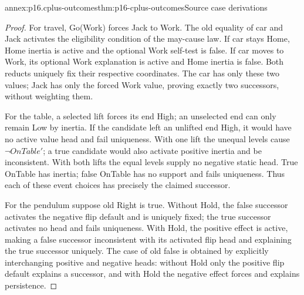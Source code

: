 \begin{annexitem}{annex:p16.cplus-outcomes}{thm:p16-cplus-outcomes}{Source case derivations}
\begin{proof}
For travel, Go(Work) forces Jack to Work.
The old equality of car and Jack activates the eligibility condition
of the may-cause law. If car stays Home, Home inertia is active and
the optional Work self-test is false. If car moves to Work, its
optional Work explanation is active and Home inertia is false.
Both reducts uniquely fix their respective coordinates.
The car has only these two values; Jack has only the forced Work
value, proving exactly two successors, without weighting them.

For the table, a selected lift forces its end High; an unselected
end can only remain Low by inertia. If the candidate left an unlifted
end High, it would have no active value head and fail uniqueness.
With one lift the unequal levels cause \(\neg OnTable'\);
a true candidate would also activate positive inertia and be
inconsistent. With both lifts the equal levels supply no negative
static head. True OnTable has inertia; false OnTable has no support
and fails uniqueness. Thus each of these event choices has precisely
the claimed successor.

For the pendulum suppose old Right is true. Without Hold, the false
successor activates the negative flip default and is uniquely fixed;
the true successor activates no head and fails uniqueness.
With Hold, the positive effect is active, making a false successor
inconsistent with its activated flip head and explaining the true
successor uniquely. The case of old false is obtained by explicitly
interchanging positive and negative heads: without Hold only the
positive flip default explains a successor, and with Hold the
negative effect forces and explains persistence.
\end{proof}
\end{annexitem}

